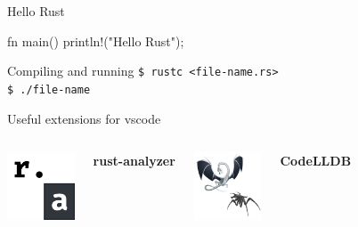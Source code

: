     \begin{frame}[fragile]{Hello Rust}
        \begin{code}
            fn main() {
                println!("Hello Rust");
            }
        \end{code}

        \begin{alertblock}{Compiling and running}
            \tt{\$ rustc <file-name.rs>} \\
            \tt{\$ ./file-name}
        \end{alertblock}
    \end{frame}

    \begin{frame}{Useful extensions for vscode}
        \begin{columns}[t, onlytextwidth]
                \centering
                \includegraphics[height=2cm, keepaspectratio]{images/rust-analyzer.jpeg}

                \textbf{rust-analyzer}

                \centering
                \includegraphics[height=2cm, keepaspectratio]{images/code-lldb.jpeg}

                \textbf{CodeLLDB}
        \end{columns}
    \end{frame}

